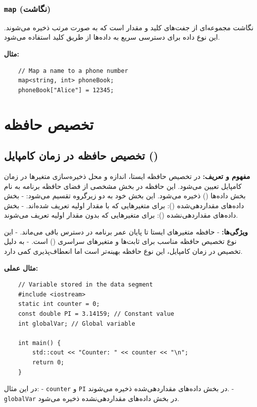 \documentclass[12pt, a4paper]{report}
\begin{document}
\subsubsection{ \texttt{map} (نگاشت)}
نگاشت مجموعه‌ای از جفت‌های کلید و مقدار است که به صورت مرتب ذخیره می‌شوند. این نوع داده برای دسترسی سریع به داده‌ها از طریق کلید استفاده می‌شود.

\textbf{مثال:}
\LTR
\begin{lstlisting}
	// Map a name to a phone number
	map<string, int> phoneBook;
	phoneBook["Alice"] = 12345;
\end{lstlisting}
\RTL

\section{تخصیص حافظه}

\subsection{ تخصیص حافظه در زمان کامپایل ()}

\textbf{مفهوم و تعریف:}  
در تخصیص حافظه ایستا، اندازه و محل ذخیره‌سازی متغیرها در زمان کامپایل تعیین می‌شود. این حافظه در بخش مشخصی از فضای حافظه برنامه به نام بخش داده‌ها () ذخیره می‌شود. این بخش خود به دو زیرگروه تقسیم می‌شود:  
- بخش داده‌های مقداردهی‌شده (): برای متغیرهایی که با مقدار اولیه تعریف شده‌اند.  
- بخش داده‌های مقداردهی‌نشده (): برای متغیرهایی که بدون مقدار اولیه تعریف می‌شوند.  

\textbf{ویژگی‌ها:}  
- حافظه متغیرهای ایستا تا پایان عمر برنامه در دسترس باقی می‌ماند.  
- این نوع تخصیص حافظه مناسب برای ثابت‌ها و متغیرهای سراسری () است.  
- به دلیل تخصیص در زمان کامپایل، این نوع حافظه بهینه‌تر است اما انعطاف‌پذیری کمی دارد.  

\textbf{مثال عملی:}
\LTR
\begin{lstlisting}
	// Variable stored in the data segment
	#include <iostream>
	static int counter = 0; 
	const double PI = 3.14159; // Constant value
	int globalVar; // Global variable
	
	int main() {
		std::cout << "Counter: " << counter << "\n";
		return 0;
	}
\end{lstlisting}
\RTL

در این مثال:
- \texttt{counter} و \texttt{PI} در بخش داده‌های مقداردهی‌شده ذخیره می‌شوند.
- \texttt{globalVar} در بخش داده‌های مقداردهی‌نشده ذخیره می‌شود.
\end{document}
